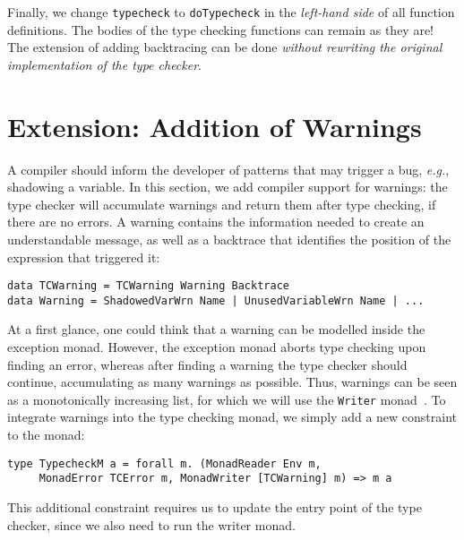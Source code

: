 \documentclass[sigplan,screen]{acmart}
\makeatletter
\newcommand{\ec}[1]{\lstinline[style=encore,breaklines=true,basicstyle=\fontsize{9}{9}\tt]@#1@}
\makeatother
\begin{document}
Finally, we change
\ec{typecheck} to
\ec{doTypecheck} in the \emph{left-hand side} of all function
definitions.
The bodies of the type checking functions can remain
as they are!
%
The extension of adding backtracing can be done \emph{without
  rewriting the original implementation of the type checker}.

\section{Extension: Addition of Warnings}
\label{sec:warnings}

A compiler should inform the developer of patterns that may trigger a bug,
\textit{e.g.}, shadowing a variable.
In this section, we add compiler support for
warnings: the type checker will accumulate warnings
and return them after type checking, if there are no errors.
%
A warning contains the information needed to create
an understandable message, as
well as a backtrace that identifies the position of the expression that
triggered it:

\begin{minipage}[t]{\linewidth}
\begin{lstlisting}[style=encore]
data TCWarning = TCWarning Warning Backtrace
data Warning = ShadowedVarWrn Name | UnusedVariableWrn Name | ...
\end{lstlisting}
\end{minipage}

At a first glance, one could think that a warning can be modelled inside the
exception monad.
However, the exception monad aborts type checking upon finding an error, whereas
after finding a warning the type checker should continue, accumulating as many
warnings as possible. Thus, warnings can be seen as a monotonically increasing
list, for which we will use the \ec{Writer} monad~\cite{reader-writer-monad}.
To integrate warnings into the type checking monad, we simply add a new
constraint to the monad:

\begin{minipage}[t]{\linewidth}
\begin{lstlisting}[style=encore]
type TypecheckM a = forall m. (MonadReader Env m,
     MonadError TCError m, MonadWriter [TCWarning] m) => m a
\end{lstlisting}
\end{minipage}

This additional constraint requires us to update the entry point
of the type checker, since we also need to run the writer monad.
\end{document}
